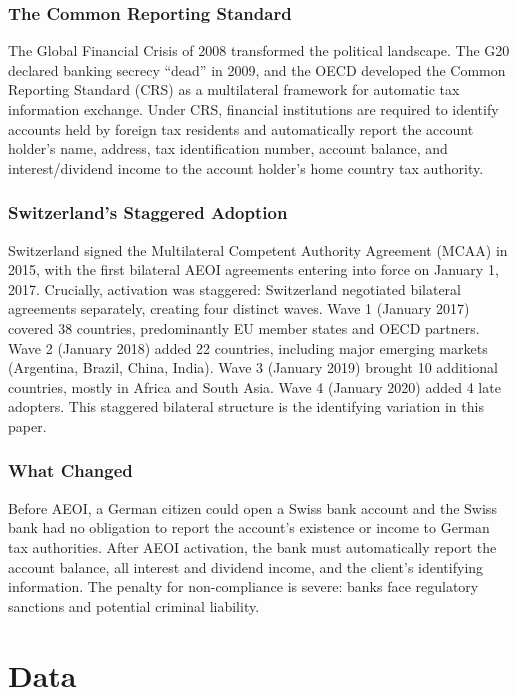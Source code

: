 \documentclass[12pt]{article}
\begin{document}
\subsubsection*{The Common Reporting Standard} The Global Financial Crisis of 2008 transformed the political landscape. The G20 declared banking secrecy ``dead'' in 2009, and the OECD developed the Common Reporting Standard (CRS) as a multilateral framework for automatic tax information exchange. Under CRS, financial institutions are required to identify accounts held by foreign tax residents and automatically report the account holder's name, address, tax identification number, account balance, and interest/dividend income to the account holder's home country tax authority.

\subsubsection*{Switzerland's Staggered Adoption} Switzerland signed the Multilateral Competent Authority Agreement (MCAA) in 2015, with the first bilateral AEOI agreements entering into force on January 1, 2017. Crucially, activation was staggered: Switzerland negotiated bilateral agreements separately, creating four distinct waves. Wave 1 (January 2017) covered 38 countries, predominantly EU member states and OECD partners. Wave 2 (January 2018) added 22 countries, including major emerging markets (Argentina, Brazil, China, India). Wave 3 (January 2019) brought 10 additional countries, mostly in Africa and South Asia. Wave 4 (January 2020) added 4 late adopters. This staggered bilateral structure is the identifying variation in this paper.

\subsubsection*{What Changed} Before AEOI, a German citizen could open a Swiss bank account and the Swiss bank had no obligation to report the account's existence or income to German tax authorities. After AEOI activation, the bank must automatically report the account balance, all interest and dividend income, and the client's identifying information. The penalty for non-compliance is severe: banks face regulatory sanctions and potential criminal liability.

\section{Data}
\end{document}
